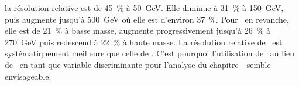 la résolution relative est de \SI{45}{\%} à \SI{50}{\GeV}.
Elle diminue à \SI{31}{\%} à \SI{150}{\GeV},
puis augmente jusqu'à \SI{500}{\GeV} où elle est d'environ \SI{37}{\%}.
Pour \mml\ en revanche,
elle est de \SI{21}{\%} à basse masse,
augmente progressivement jusqu'à \SI{26}{\%} à \SI{270}{\GeV}
puis redescend à \SI{22}{\%} à haute masse.
La résolution relative de \mml\ est systématiquement meilleure que celle de \mTtot.
C'est pourquoi l'utilisation de \mml\ au lieu de \mTtot\ en tant que variable discriminante pour l'analyse du chapitre~\ semble envisageable.
%
%
%
